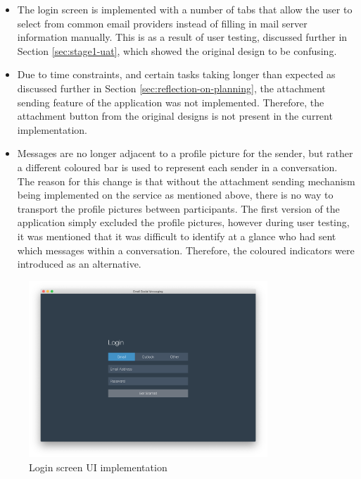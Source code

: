 \begin{itemize}
  \item The login screen is implemented with a number of tabs that allow the user to select from common email providers instead of filling in mail server information manually. This is as a result of user testing, discussed further in Section \ref{sec:stage1-uat}, which showed the original design to be confusing.
  \item Due to time constraints, and certain tasks taking longer than expected as discussed further in Section \ref{sec:reflection-on-planning}, the attachment sending feature of the application was not implemented. Therefore, the attachment button from the original designs is not present in the current implementation.
  \item Messages are no longer adjacent to a profile picture for the sender, but rather a different coloured bar is used to represent each sender in a conversation. The reason for this change is that without the attachment sending mechanism being implemented on the service as mentioned above, there is no way to transport the profile pictures between participants. The first version of the application simply excluded the profile pictures, however during user testing, it was mentioned that it was difficult to identify at a glance who had sent which messages within a conversation. Therefore, the coloured indicators were introduced as an alternative.
\end{itemize}

\begin{figure}[h!]
  \centering
  \includegraphics[width=0.8\textwidth]{images/implementation-login.png}
  \caption{Login screen UI implementation}
  \label{fig:main-ui}
\end{figure}

